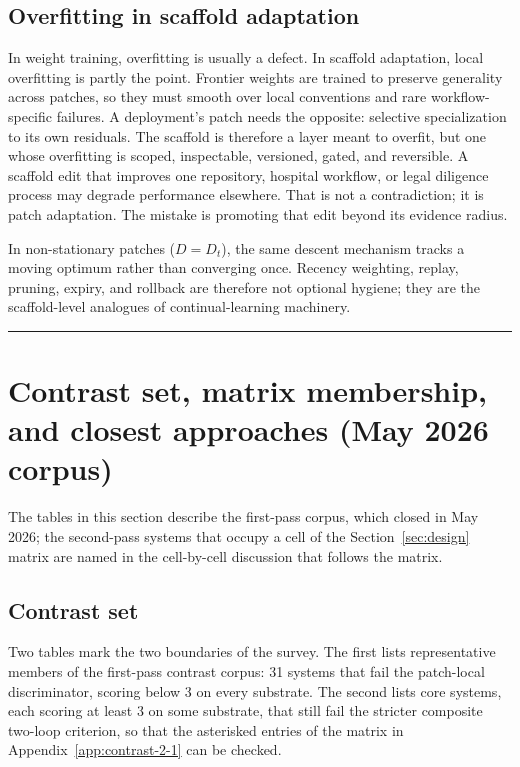 \documentclass[
  11pt,
]{article}
\begin{document}
\subsection{Overfitting in scaffold adaptation}\label{app:mechanism-3}

In weight training, overfitting is usually a defect. In scaffold adaptation, local overfitting is partly the point. Frontier weights are trained to preserve generality across patches, so they must smooth over local conventions and rare workflow-specific failures. A deployment's patch needs the opposite: selective specialization to its own residuals. The scaffold is therefore a layer meant to overfit, but one whose overfitting is scoped, inspectable, versioned, gated, and reversible. A scaffold edit that improves one repository, hospital workflow, or legal diligence process may degrade performance elsewhere. That is not a contradiction; it is patch adaptation. The mistake is promoting that edit beyond its evidence radius.

In non-stationary patches (\(D = D_t\)), the same descent mechanism tracks a moving optimum rather than converging once. Recency weighting, replay, pruning, expiry, and rollback are therefore not optional hygiene; they are the scaffold-level analogues of continual-learning machinery.

\begin{center}\rule{0.5\linewidth}{0.5pt}\end{center}

\section{Contrast set, matrix membership, and closest approaches (May 2026 corpus)}\label{app:contrast}

The tables in this section describe the first-pass corpus, which closed in May 2026; the second-pass systems that occupy a cell of the Section~\ref{sec:design} matrix are named in the cell-by-cell discussion that follows the matrix.

\subsection{Contrast set}\label{app:contrast-1}

Two tables mark the two boundaries of the survey. The first lists representative members of the first-pass contrast corpus: 31 systems that fail the patch-local discriminator, scoring below 3 on every substrate. The second lists core systems, each scoring at least 3 on some substrate, that still fail the stricter composite two-loop criterion, so that the asterisked entries of the matrix in Appendix~\ref{app:contrast-2-1} can be checked.
\end{document}
